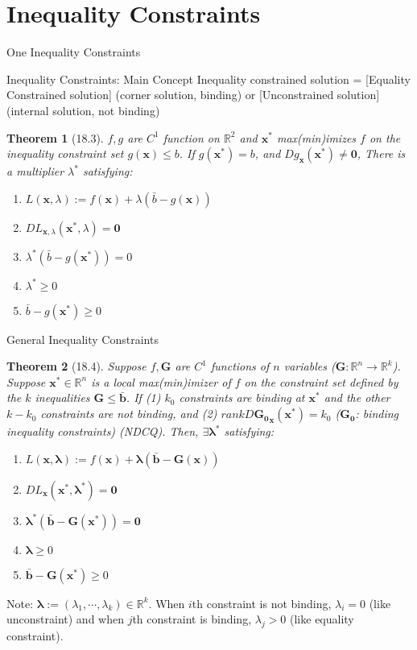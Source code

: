 \documentclass[final]{beamer}
\newtheorem{thm}{Theorem}
\newcommand{\bb}{\mathbb}
\newcommand{\bd}{\mathbf}
\begin{document}
\section{Inequality Constraints} %
\label{sec:inequality_constraints}
\begin{frame}[t]{One Inequality Constraints}
	\begin{block}
		{Inequality Constraints: Main Concept}
		Inequality constrained solution = [Equality Constrained solution] (corner solution, binding) or [Unconstrained solution] (internal solution, not binding)
	\end{block}
	\begin{thm}
		[18.3] $f,g$ are $C^1$ function on $\bb{R}^2$ and $\bd{x^\ast}$ max(min)imizes $f$ on the inequality constraint set $g(\bd{x})\le b$. If $g(\bd{x^\ast})=b$, and $Dg_{\bd{x}}(\bd{x^\ast})\neq \bd{0}$, There is a multiplier $\lambda^\ast$ satisfying:
		\begin{enumerate}
			\item $L(\bd{x},\lambda):=f(\bd{x})+\lambda(\bar{b}-g(\bd{x}))$
			\item $DL_{\bd{x},\lambda}(\bd{x^\ast},\lambda)=\bd{0}$
			\item $\lambda^\ast(\bar{b}-g(\bd{x^\ast}))=0$
			\item $\lambda^\ast\ge 0$
			\item $\bar{b}-g(\bd{x^\ast})\ge 0$
		\end{enumerate}
	\end{thm}
\end{frame}

\begin{frame}[t]{General Inequality Constraints}
	\begin{thm}
		[18.4] Suppose $f,\bd{G}$ are $C^1$ functions of $n$ variables ($\bd{G}:\bb{R}^n\rightarrow\bb{R}^k$). Suppose $\bd{x^\ast}\in\bb{R}^n$ is a local max(min)imizer of $f$ on the constraint set defined by the $k$  inequalities $\bd{G}\le \bar{\bd{b}}$. If (1) $k_0$ constraints are binding at $\bd{x^\ast}$ and the other $k-k_0$ constraints are not binding, and (2) $rank D\bd{G_0}_{\bd{x}}(\bd{x^\ast})= k_0$ ($\bd{G_0}$: binding inequality constraints) (NDCQ). Then, $\exists\bd{\lambda^\ast}$ satisfying:
		\begin{enumerate}
			\item $L(\bd{x},\bd{\lambda}):=f(\bd{x})+\bd{\lambda}(\bar{\bd{b}}-\bd{G}(\bd{x}))$
			\item $DL_{\bd{x}}(\bd{x^\ast,\lambda^\ast})=\bd{0}$
			\item $\bd{\lambda^\ast}(\bar{\bd{b}}-\bd{G}(\bd{x^\ast}))=\bd{0}$
			\item $\bd{\lambda}\ge 0$
			\item $\bar{\bd{b}}-\bd{G}(\bd{x^\ast})\ge 0$
		\end{enumerate}
	\end{thm}
	Note: $\bd{\lambda}:=(\lambda_1,\cdots,\lambda_k)\in \bb{R}^k$. When $i$th constraint is not binding, $\lambda_i=0$ (like unconstraint) and when $j$th constraint is binding, $\lambda_j> 0$ (like equality constraint).
\end{frame}
\end{document}
